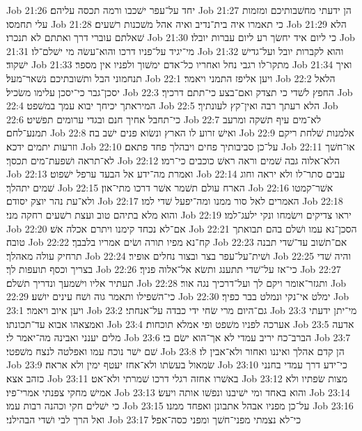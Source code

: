Job 21:26  יחד על־עפר ישׁכבו ורמה תכסה עליהם׃
Job 21:27  הן ידעתי מחשׁבותיכם ומזמות עלי תחמסו׃
Job 21:28  כי תאמרו איה בית־נדיב ואיה אהל משׁכנות רשׁעים׃
Job 21:29  הלא שׁאלתם עוברי דרך ואתתם לא תנכרו׃
Job 21:30  כי ליום איד יחשׂך רע ליום עברות יובלו׃
Job 21:31  מי־יגיד על־פניו דרכו והוא־עשׂה מי ישׁלם־לו׃
Job 21:32  והוא לקברות יובל ועל־גדישׁ ישׁקוד׃
Job 21:33  מתקו־לו רגבי נחל ואחריו כל־אדם ימשׁוך ולפניו אין מספר׃
Job 21:34  ואיך תנחמוני הבל ותשׁובתיכם נשׁאר־מעל׃
Job 22:1  ויען אליפז התמני ויאמר׃
Job 22:2  הלאל יסכן־גבר כי־יסכן עלימו משׂכיל׃
Job 22:3  החפץ לשׁדי כי תצדק ואם־בצע כי־תתם דרכיך׃
Job 22:4  המיראתך יכיחך יבוא עמך במשׁפט׃
Job 22:5  הלא רעתך רבה ואין־קץ לעונתיך׃
Job 22:6  כי־תחבל אחיך חנם ובגדי ערומים תפשׁיט׃
Job 22:7  לא־מים עיף תשׁקה ומרעב תמנע־לחם׃
Job 22:8  ואישׁ זרוע לו הארץ ונשׂוא פנים ישׁב בה׃
Job 22:9  אלמנות שׁלחת ריקם וזרעות יתמים ידכא׃
Job 22:10  על־כן סביבותיך פחים ויבהלך פחד פתאם׃
Job 22:11  או־חשׁך לא־תראה ושׁפעת־מים תכסך׃
Job 22:12  הלא־אלוה גבה שׁמים וראה ראשׁ כוכבים כי־רמו׃
Job 22:13  ואמרת מה־ידע אל הבעד ערפל ישׁפוט׃
Job 22:14  עבים סתר־לו ולא יראה וחוג שׁמים יתהלך׃
Job 22:15  הארח עולם תשׁמר אשׁר דרכו מתי־און׃
Job 22:16  אשׁר־קמטו ולא־עת נהר יוצק יסודם׃
Job 22:17  האמרים לאל סור ממנו ומה־יפעל שׁדי למו׃
Job 22:18  והוא מלא בתיהם טוב ועצת רשׁעים רחקה מני׃
Job 22:19  יראו צדיקים וישׂמחו ונקי ילעג־למו׃
Job 22:20  אם־לא נכחד קימנו ויתרם אכלה אשׁ׃
Job 22:21  הסכן־נא עמו ושׁלם בהם תבואתך טובה׃
Job 22:22  קח־נא מפיו תורה ושׂים אמריו בלבבך׃
Job 22:23  אם־תשׁוב עד־שׁדי תבנה תרחיק עולה מאהלך׃
Job 22:24  ושׁית־על־עפר בצר ובצור נחלים אופיר׃
Job 22:25  והיה שׁדי בצריך וכסף תועפות לך׃
Job 22:26  כי־אז על־שׁדי תתענג ותשׂא אל־אלוה פניך׃
Job 22:27  תעתיר אליו וישׁמעך ונדריך תשׁלם׃
Job 22:28  ותגזר־אומר ויקם לך ועל־דרכיך נגה אור׃
Job 22:29  כי־השׁפילו ותאמר גוה ושׁח עינים יושׁע׃
Job 22:30  ימלט אי־נקי ונמלט בבר כפיך׃
Job 23:1  ויען איוב ויאמר׃
Job 23:2  גם־היום מרי שׂחי ידי כבדה על־אנחתי׃
Job 23:3  מי־יתן ידעתי ואמצאהו אבוא עד־תכונתו׃
Job 23:4  אערכה לפניו משׁפט ופי אמלא תוכחות׃
Job 23:5  אדעה מלים יענני ואבינה מה־יאמר לי׃
Job 23:6  הברב־כח יריב עמדי לא אך־הוא ישׂם בי׃
Job 23:7  שׁם ישׁר נוכח עמו ואפלטה לנצח משׁפטי׃
Job 23:8  הן קדם אהלך ואיננו ואחור ולא־אבין לו׃
Job 23:9  שׂמאול בעשׂתו ולא־אחז יעטף ימין ולא אראה׃
Job 23:10  כי־ידע דרך עמדי בחנני כזהב אצא׃
Job 23:11  באשׁרו אחזה רגלי דרכו שׁמרתי ולא־אט׃
Job 23:12  מצות שׂפתיו ולא אמישׁ מחקי צפנתי אמרי־פיו׃
Job 23:13  והוא באחד ומי ישׁיבנו ונפשׁו אותה ויעשׂ׃
Job 23:14  כי ישׁלים חקי וכהנה רבות עמו׃
Job 23:15  על־כן מפניו אבהל אתבונן ואפחד ממנו׃
Job 23:16  ואל הרך לבי ושׁדי הבהילני׃
Job 23:17  כי־לא נצמתי מפני־חשׁך ומפני כסה־אפל׃
